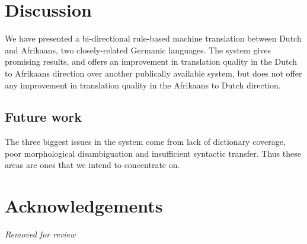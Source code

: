 \documentclass[11pt]{article}
\newcommand{\confname}{EAMT 2011}
\begin{document}

\section{Discussion}

We have presented a bi-directional rule-based machine translation between Dutch and Afrikaans, 
two closely-related Germanic languages. The system gives promising results, and offers an improvement
in translation quality in the Dutch to Afrikaans direction over another publically available system, 
but does not offer any improvement in translation quality in the Afrikaans to Dutch direction.

\subsection{Future work}

The three biggest issues in the system come from lack of dictionary coverage, poor morphological
disambiguation and insufficient syntactic transfer. Thus these areas are ones that we intend to 
concentrate on.

\section*{Acknowledgements}
\emph{Removed for review}

% 
\end{document}
